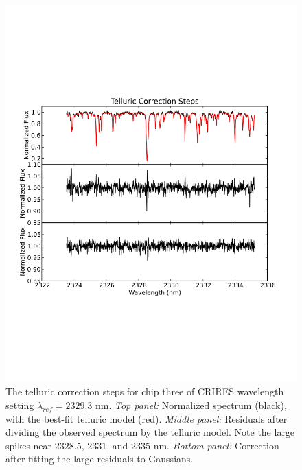 \begin{figure}[ht]
  \centering
  \includegraphics[width=\columnwidth]{Figures/paper1_fig3.pdf}
  \caption{The telluric correction steps for chip three of CRIRES
    wavelength setting $\lambda_{ref} = 2329.3$ nm. \emph{Top panel:}
    Normalized spectrum (black), with the best-fit telluric model
    (red). \emph{Middle panel:} Residuals after dividing the observed
    spectrum by the telluric model. Note the large spikes near
    $2328.5$, $2331$, and $2335$ nm. \emph{Bottom panel:} Correction
    after fitting the large residuals to Gaussians. }
  \label{correctionsteps}
\end{figure}



